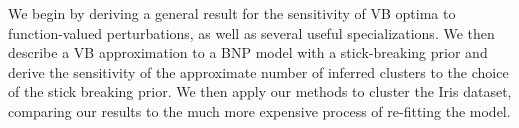 We begin by deriving a general result for the sensitivity of VB optima to
function-valued perturbations, as well as several useful specializations. We
then describe a VB approximation to a BNP model with a stick-breaking prior and
derive the sensitivity of the approximate number of inferred clusters to the
choice of the stick breaking prior. We then apply our methods to cluster the
Iris \citep{iris_data_anderson, iris_data_fisher} dataset, comparing our results
to the much more expensive process of re-fitting the model.
